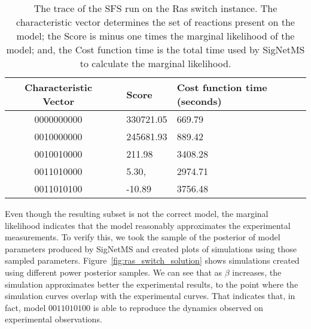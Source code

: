 \begin{table}[H]
\centering
\begin{tabular}{c|cll}
\hline
Characteristic Vector && \multicolumn{1}{l}{Score} &
\multicolumn{1}{l}{Cost function time (seconds)} \\
\hline
    0000000000 && 330721.05	& 669.79	\\
    0010000000 && 245681.93	& 889.42	\\
    0010010000 && 211.98	& 3408.28	\\
    0011010000 && 5.30,	& 2974.71	\\
    0011010100 && -10.89	& 3756.48	\\  
\hline
\hline
\end{tabular}
\caption{The trace of the SFS run on the Ras switch instance. The
    characteristic vector determines the set of reactions present on the
    model; the Score is minus one times the marginal likelihood of
    the model; and, the Cost function time is the total time used by 
    SigNetMS to calculate the marginal likelihood.}
\label{tab:sfs_trace}
\end{table}

Even though the resulting subset is not the correct model, the marginal
likelihood indicates that the model reasonably approximates the
experimental measurements. To verify this, we took the sample of the
posterior of model parameters produced by SigNetMS and created plots of 
simulations using those sampled parameters.
Figure~\ref{fig:ras_switch_solution} shows simulations created using
different power posterior samples. We can see that as $\beta$ increases,
the simulation approximates better the experimental results, to the
point where the simulation curves overlap with the experimental curves.
That indicates that, in fact, model $0011010100$ is able to reproduce
the dynamics observed on experimental observations.

